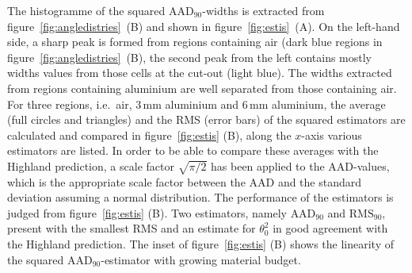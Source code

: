 \documentclass{PoS}
\newcommand{\rmsninety}{\ensuremath{\textrm{RMS}_\textrm{90}}}
\newcommand{\aadninety}{\ensuremath{\textrm{AAD}_\textrm{90}}}
\begin{document}
%

The histogramme of the squared $\aadninety$-widths is extracted from figure~\ref{fig:angledistries}~(B) and shown in figure~\ref{fig:estis}~(A).
On the left-hand side, a sharp peak is formed from regions containing air (dark blue regions in figure~\ref{fig:angledistries}~(B),
 the second peak from the left contains mostly widths values from those cells at the cut-out (light blue).
The widths extracted from regions containing aluminium are well separated from those containing air. 
For three regions, i.e.\ air, 3\,mm aluminium and 6\,mm aluminium, the average (full circles and triangles) and the RMS (error bars) of the squared estimators are calculated and compared in figure~\ref{fig:estis} (B), 
 along the $x$-axis various estimators are listed. 
In order to be able to compare these averages with the Highland prediction, a scale factor $\sqrt{\pi/2}$
 has been applied to the AAD-values, which is the appropriate scale factor between the AAD and the standard deviation assuming a normal distribution. 
The performance of the estimators is judged from figure~\ref{fig:estis} (B).
Two estimators, namely $\aadninety$ and $\rmsninety$, present with the smallest RMS and an estimate for $\theta_0^2$ in good agreement with the Highland prediction. 
The inset of figure~\ref{fig:estis} (B) shows the linearity of the squared $\aadninety$-estimator with growing material budget. 
\end{document}

